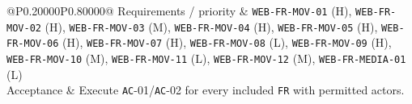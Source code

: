 \begin{longtable}{@{}P{0.20000\SRSWidth}P{0.80000\SRSWidth}@{}}
Requirements /\allowbreak{} priority & \texttt{WEB-\allowbreak{}FR-\allowbreak{}MOV-\allowbreak{}01} (H), \texttt{WEB-\allowbreak{}FR-\allowbreak{}MOV-\allowbreak{}02} (H), \texttt{WEB-\allowbreak{}FR-\allowbreak{}MOV-\allowbreak{}03} (M), \texttt{WEB-\allowbreak{}FR-\allowbreak{}MOV-\allowbreak{}04} (H), \texttt{WEB-\allowbreak{}FR-\allowbreak{}MOV-\allowbreak{}05} (H), \texttt{WEB-\allowbreak{}FR-\allowbreak{}MOV-\allowbreak{}06} (H), \texttt{WEB-\allowbreak{}FR-\allowbreak{}MOV-\allowbreak{}07} (H), \texttt{WEB-\allowbreak{}FR-\allowbreak{}MOV-\allowbreak{}08} (L), \texttt{WEB-\allowbreak{}FR-\allowbreak{}MOV-\allowbreak{}09} (H), \texttt{WEB-\allowbreak{}FR-\allowbreak{}MOV-\allowbreak{}10} (M), \texttt{WEB-\allowbreak{}FR-\allowbreak{}MOV-\allowbreak{}11} (L), \texttt{WEB-\allowbreak{}FR-\allowbreak{}MOV-\allowbreak{}12} (M), \texttt{WEB-\allowbreak{}FR-\allowbreak{}MEDIA-\allowbreak{}01} (L) \\[3pt]
Acceptance & Execute \texttt{AC}-01/\allowbreak{}\texttt{AC}-02 for every included \texttt{FR} with permitted actors. \\[3pt]
\end{longtable}
\endgroup

